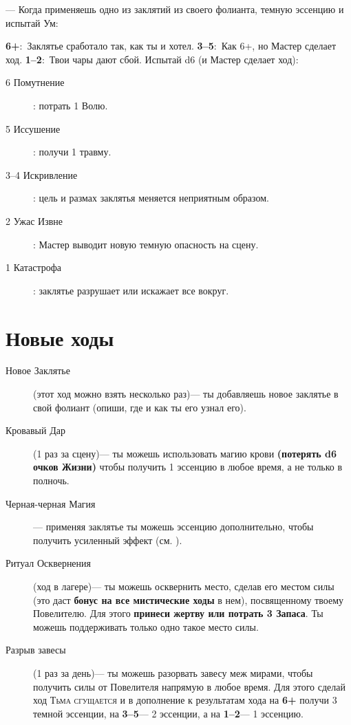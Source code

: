 \documentclass[10pt,twoside]{report}
\begin{document}
\begin{description}[noitemsep]
\begin{description}[noitemsep]
\end{description}
\vfill
\pagebreak

\item[Колдовство]--- Когда применяешь одно из заклятий из своего
  фолианта, { темную эссенцию и испытай Ум}:
  
 \textbf{6+}:~Заклятье сработало так, как ты и
хотел. \textbf{3--5}:~Как 6+, но Мастер сделает
ход.  \textbf{1--2}:~Твои чары дают сбой. Испытай d6 (и Мастер сделает ход):
  \begin{description}
\item[6 Помутнение]: потрать 1 Волю.
\item[5 Иссушение]: получи 1 травму.
\item[3--4 Искривление]: цель и размах заклятья меняется неприятным образом.
\item[2 Ужас Извне]: Мастер выводит новую темную опасность на сцену.
\item[1 Катастрофа]: заклятье разрушает или искажает все вокруг.
\end{description}
\end{description}
\vfill
\pagebreak

\section*{Новые ходы}
\begin{description}
\item[Новое Заклятье] (этот ход можно взять несколько раз)--- ты
  добавляешь новое заклятье в свой фолиант (опиши, где и как ты его узнал его).
\item[Кровавый Дар] (1 раз за сцену)--- ты можешь использовать магию
  крови {\bfseries (потерять d6 очков Жизни)} чтобы получить 1
  эссенцию в любое время, а не только в полночь.
\item[Черная-черная Магия]--- применяя заклятье ты можешь
  { эссенцию дополнительно}, чтобы получить усиленный эффект (см. {}).
\item[Ритуал Осквернения] (ход в лагере)--- ты можешь осквернить место,
  сделав его местом силы (это даст {\bfseries бонус на все мистические
    ходы} в нем), посвященному твоему Повелителю. Для этого {\bfseries
    принеси   жертву или потрать 3 Запаса}. Ты можешь поддерживать только одно такое место силы.
\item[Разрыв завесы] (1 раз за день)--- ты можешь разорвать завесу меж
  мирами, чтобы получить силы от Повелителя напрямую в любое
  время. Для этого сделай ход {\scshape Тьма сгущается} и в дополнение к результатам хода на \textbf{6+} получи 3 темной эссенции, на \textbf{3--5}--- 2 эссенции, а на \textbf{1--2}--- 1 эссенцию.
\end{description}
\pagebreak
\end{document}
